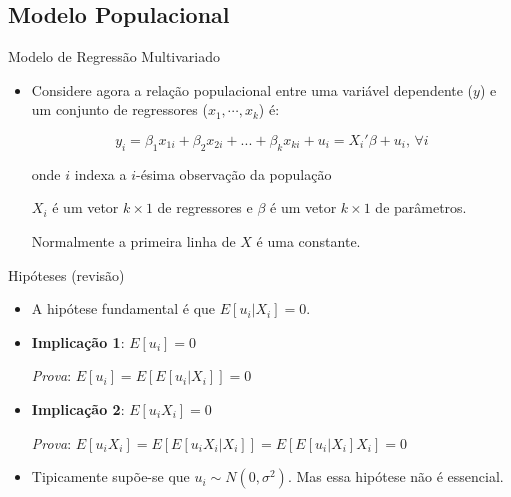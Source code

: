 \documentclass[10pt,slides,xcolor=pdftex,dvipsnames,table]{beamer}
\begin{document}
\subsection{Modelo Populacional}


\begin{frame}{Modelo de Regressão Multivariado}

\begin{itemize}\itemsep1.2em

    \item Considere agora a relação populacional entre uma variável dependente ($y$) e um conjunto de regressores ($x_1,\cdots,x_k$) é:
    
    $$ y_i = \beta_1 x_{1i} + \beta_2 x_{2i} + ... + \beta_{k} x_{ki} + u_i = X_i' \beta + u_i, \, \forall i$$
    
\vspace*{0.2cm}     
    
    onde $i$ indexa a $i$-ésima observação da população
    
\vspace*{0.2cm}    
    
    $X_i$ é um vetor $k \times 1$ de regressores e $\beta$ é um vetor $k \times 1$ de parâmetros. 
    
\vspace*{0.2cm}     
    
    Normalmente a primeira linha de $X$ é uma constante.    
    
    \end{itemize}

\end{frame}


\begin{frame}{Hipóteses (revisão)}

\begin{itemize}\itemsep1.2em 
	
	\item A hipótese fundamental é que $E[u_i | X_i] = 0$.
            
	\item \textbf{Implicação 1}: $E[u_i]=0$
	
	\vspace{0.3cm}
	
	\textit{Prova}: $E[u_i] = E \left[ E[u_i | X_i ] \right] = 0$  
	
	\item \textbf{Implicação 2}: $E[u_i X_i]=0$

\vspace{0.3cm}
	
	\textit{Prova}: $E[u_i X_i] = E \left[ E[u_i X_i | X_i ] \right] = E \left[ E[u_i  | X_i ] X_i \right] = 0$  
	
	\item Tipicamente supõe-se que $u_i \sim N(0, \sigma^2)$. Mas essa hipótese não é essencial.      
        
\end{itemize}

\end{frame}
\end{document}
